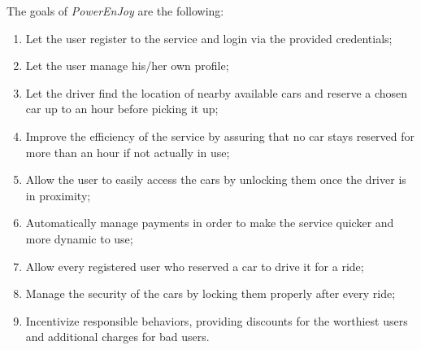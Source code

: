 The goals of \hbox{\emph{PowerEnJoy}} are the following:

\begin{enumerate}
\item Let the user register to the service and login via the provided credentials;
\item Let the user manage his/her own profile;
\item Let the driver find the location of nearby available cars and reserve a chosen car up to an hour before picking it up;
\item Improve the efficiency of the service by assuring that no car stays reserved for more than an hour if not actually in use;
\item Allow the user to easily access the cars by unlocking them once the driver is in proximity;
\item Automatically manage payments in order to make the service quicker and more dynamic to use; 
\item Allow every registered user who reserved a car to drive it for a ride;
\item Manage the security of the cars by locking them properly after every ride;
\item Incentivize responsible behaviors, providing discounts for the worthiest users and additional charges for bad users.
\end{enumerate}